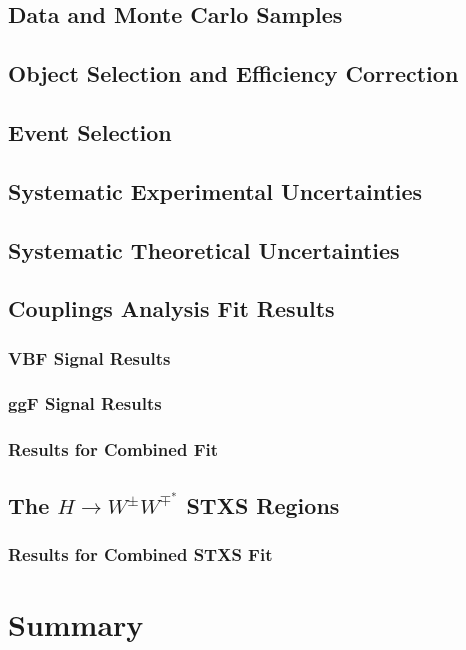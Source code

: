 \section{Data and Monte Carlo Samples}
\section{Object Selection and Efficiency Correction}
\section{Event Selection}
\section{Systematic Experimental Uncertainties}
\section{Systematic Theoretical Uncertainties}
\section{Couplings Analysis Fit Results}
\subsection{VBF Signal Results}
\subsection{ggF Signal Results}
\subsection{Results for Combined Fit}

\section{The $H\rightarrow W^{\pm}W^{\mp^*}$ STXS Regions}
\subsection{Results for Combined STXS Fit}


\chapter{Summary}



